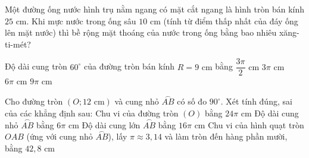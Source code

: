 \begin{bt}%
	Một đường ống nước hình trụ nằm ngang có mặt cắt ngang là hình tròn bán kính $25\text{ cm}$. Khi mực nước trong ống sâu $10\text{ cm}$ (tính từ điểm thấp nhất của đáy ống lên mặt nước) thì bề rộng mặt thoáng của nước trong ống bằng bao nhiêu xăng-ti-mét?
\end{bt}



\begin{ex}%
	Độ dài cung tròn $60^\circ$ của đường tròn bán kính $R = 9\text{ cm}$ bằng
	\choice
	{$\dfrac{3\pi}{2}\text{ cm}$}
	{\True $3\pi\text{ cm}$}
	{$6\pi\text{ cm}$}
	{$9\pi\text{ cm}$}
\end{ex}

\begin{ex}%
	Cho đường tròn $(O; 12\text{ cm})$ và cung nhỏ $\overset{\frown}{AB}$ có số đo $90^\circ$. Xét tính đúng, sai của các khẳng định sau:
	\choiceTF
	{\True Chu vi của đường tròn $(O)$ bằng $24\pi\text{ cm}$}
	{\True Độ dài cung nhỏ $\overset{\frown}{AB}$ bằng $6\pi\text{ cm}$}
	{Độ dài cung lớn $\overset{\frown}{AB}$ bằng $16\pi\text{ cm}$}
	{\True Chu vi của hình quạt tròn $OAB$ (ứng với cung nhỏ $\overset{\frown}{AB}$), lấy $\pi \approx 3{,}14$ và làm tròn đến hàng phần mười, bằng $42{,}8\text{ cm}$}
\end{ex}

